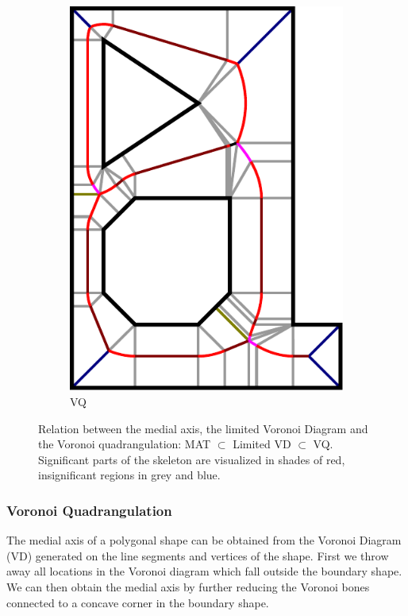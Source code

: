 \begin{figure}
\begin{subfigure}{0.3\columnwidth}
\includegraphics[width=\columnwidth]{sources/method/gMAT_example.pdf}
\caption{VQ}
\end{subfigure}
\caption{
Relation between the medial axis, the limited Voronoi Diagram and the Voronoi quadrangulation: MAT $\subset$ Limited VD $\subset$ VQ.
Significant parts of the skeleton are visualized in shades of red, insignificant regions in grey and blue.
}
\label{skeletonization_comparison}
\end{figure}



\subsubsection{Voronoi Quadrangulation}
The medial axis of a polygonal shape can be obtained from the Voronoi Diagram (VD) generated on the line segments and vertices of the shape. \cite{lee1982medial}
First we throw away all locations in the Voronoi diagram which fall outside the boundary shape.
We can then obtain the medial axis by further reducing the Voronoi bones connected to a concave corner in the boundary shape.

